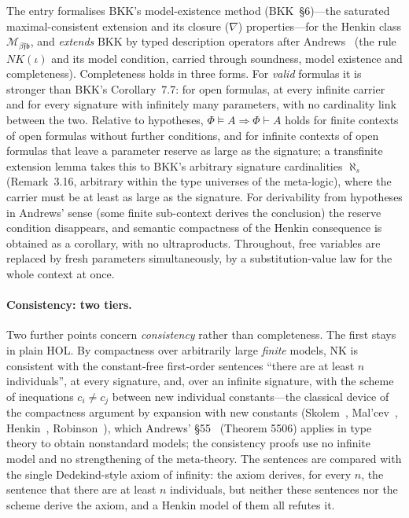 \documentclass[11pt,a4paper]{article}
\begin{document}
The entry formalises BKK's model-existence method (BKK~\S6)---the
saturated maximal-consistent extension and its closure ($\nabla$)
properties---for the Henkin class
$\mathcal{M}_{\beta\mathfrak{f}\mathfrak{b}}$, and \emph{extends} BKK by
typed description operators after Andrews~\cite{Andrews72} (the rule
$NK(\iota)$ and its model condition, carried through soundness, model
existence and completeness).  Completeness holds in three forms.  For
\emph{valid} formulas it is stronger than BKK's Corollary~7.7: for open
formulas, at every infinite carrier and for every signature with
infinitely many parameters, with no cardinality link between the two.
Relative to hypotheses, $\Phi \models A \Rightarrow \Phi \vdash A$ holds
for finite contexts of open formulas without further conditions, and for
infinite contexts of open formulas that leave a parameter reserve as
large as the signature; a transfinite extension lemma takes this to
BKK's arbitrary signature cardinalities $\aleph_s$ (Remark~3.16,
arbitrary within the type universes of the meta-logic), where the
carrier must be at least as large as the signature.  For derivability
from hypotheses in Andrews' sense (some finite sub-context derives the
conclusion) the reserve condition disappears, and semantic compactness
of the Henkin consequence is obtained as a corollary, with no
ultraproducts.  Throughout, free variables are replaced by fresh
parameters simultaneously, by a substitution-value law for the whole
context at once.

\paragraph{Consistency: two tiers.}
Two further points concern \emph{consistency} rather than completeness.
The first stays in plain HOL.  By compactness over arbitrarily large
\emph{finite} models, $\mathrm{NK}$ is consistent with the constant-free
first-order sentences ``there are at least $n$ individuals'', at every
signature, and, over an infinite signature, with the scheme of
inequations $c_i \neq c_j$ between new individual constants---the
classical device of the compactness argument by expansion with new
constants (Skolem~\cite{Skolem34}, Mal'cev~\cite{Malcev36},
Henkin~\cite{Henkin49,Henkin50}, Robinson~\cite{Robinson63}), which
Andrews' \S55~\cite{Andrews02} (Theorem 5506) applies in type theory to
obtain nonstandard models; the consistency proofs use no infinite model
and no strengthening of the meta-theory.  The sentences are compared
with the single Dedekind-style axiom of infinity: the axiom derives, for
every $n$, the sentence that there are at least $n$ individuals, but
neither these sentences nor the scheme derive the axiom, and a Henkin
model of them all refutes it.
\end{document}
